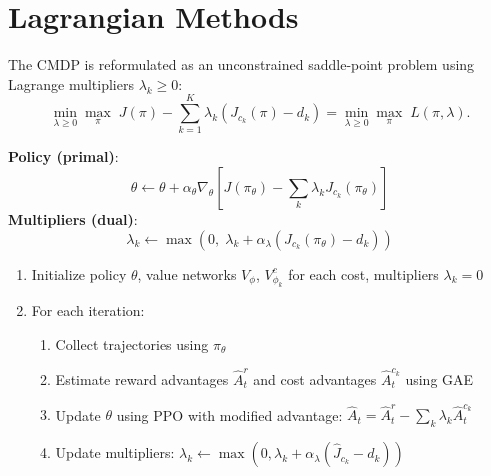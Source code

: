 \section{Lagrangian Methods}
\label{sec:lagrangian}

\begin{definition}
The CMDP is reformulated as an unconstrained saddle-point problem using
Lagrange multipliers $\lambda_k \geq 0$:
\[
    \min_{\lambda \geq 0} \max_\pi \;
    J(\pi) - \sum_{k=1}^{K} \lambda_k \left(J_{c_k}(\pi) - d_k\right)
    = \min_{\lambda \geq 0} \max_\pi \; L(\pi, \lambda).
\]
\end{definition}

\begin{keyformulas}[title=\textbf{Lagrangian Actor-Critic Update}]
\textbf{Policy (primal)}:
\[
    \theta \leftarrow \theta + \alpha_\theta \nabla_\theta \left[
    J(\pi_\theta) - \sum_k \lambda_k J_{c_k}(\pi_\theta)\right]
\]
\textbf{Multipliers (dual)}:
\[
    \lambda_k \leftarrow \max\left(0, \;
    \lambda_k + \alpha_\lambda (J_{c_k}(\pi_\theta) - d_k)\right)
\]
\end{keyformulas}

\begin{algorithme}[title=\textbf{Lagrangian PPO for CMDPs}]
\begin{enumerate}
    \item Initialize policy $\theta$, value networks $V_\phi$, $V_{\phi_k}^{c}$ for each cost,
          multipliers $\lambda_k = 0$
    \item For each iteration:
    \begin{enumerate}
        \item Collect trajectories using $\pi_\theta$
        \item Estimate reward advantages $\hat{A}_t^r$ and cost advantages
              $\hat{A}_t^{c_k}$ using GAE
        \item Update $\theta$ using PPO with modified advantage:
              $\hat{A}_t = \hat{A}_t^r - \sum_k \lambda_k \hat{A}_t^{c_k}$
        \item Update multipliers:
              $\lambda_k \leftarrow \max(0, \lambda_k + \alpha_\lambda(\hat{J}_{c_k} - d_k))$
    \end{enumerate}
\end{enumerate}
\end{algorithme}

